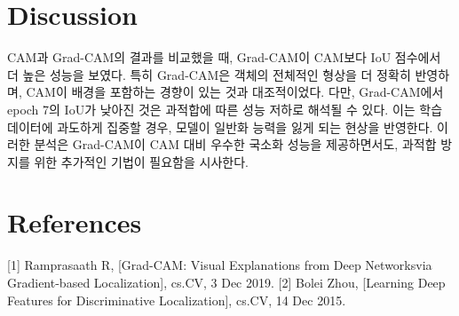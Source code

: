 \documentclass[twocolumn]{article}
\begin{document}
\section{Discussion}

CAM과 Grad-CAM의 결과를 비교했을 때, Grad-CAM이 CAM보다 IoU 점수에서 더 높은 성능을 보였다.
특히 Grad-CAM은 객체의 전체적인 형상을 더 정확히 반영하며, CAM이 배경을 포함하는 경향이 있는 것과 대조적이었다.
다만, Grad-CAM에서 epoch 7의 IoU가 낮아진 것은 과적합에 따른 성능 저하로 해석될 수 있다.
이는 학습 데이터에 과도하게 집중할 경우, 모델이 일반화 능력을 잃게 되는 현상을 반영한다.
이러한 분석은 Grad-CAM이 CAM 대비 우수한 국소화 성능을 제공하면서도, 과적합 방지를 위한 추가적인 기법이 필요함을 시사한다.

\section{References}

[1] Ramprasaath R, [Grad-CAM: Visual Explanations from Deep Networksvia Gradient-based Localization], cs.CV, 3 Dec 2019.
[2] Bolei Zhou, [Learning Deep Features for Discriminative Localization], cs.CV, 14 Dec 2015.
\end{document}
